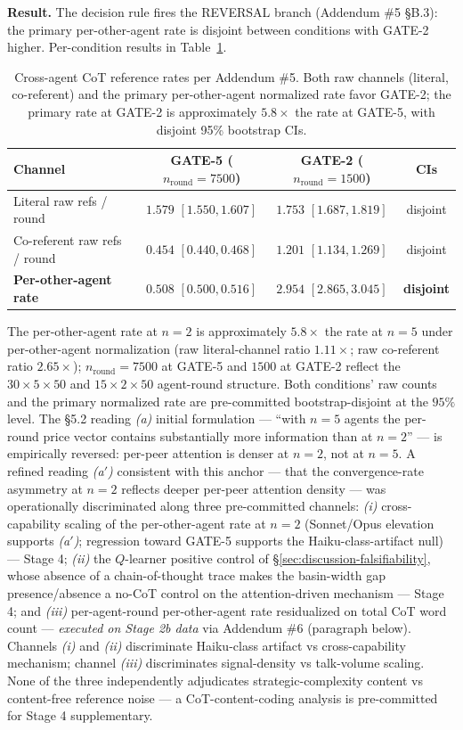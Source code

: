 \textbf{Result.} The decision rule fires the REVERSAL branch (Addendum \#5 \S B.3): the primary per-other-agent rate is disjoint between conditions with GATE-2 higher. Per-condition results in Table~\ref{tab:cot-cross-references}.

\begin{table}[h]
\centering
\caption{Cross-agent CoT reference rates per Addendum \#5. Both raw channels (literal, co-referent) and the primary per-other-agent normalized rate favor GATE-2; the primary rate at GATE-2 is approximately $5.8\times$ the rate at GATE-5, with disjoint 95\% bootstrap CIs.}
\label{tab:cot-cross-references}
\begin{tabular}{lccc}
\toprule
Channel & GATE-5 ($n_{\text{round}} = 7500$) & GATE-2 ($n_{\text{round}} = 1500$) & CIs \\
\midrule
Literal raw refs / round & $1.579$ $[1.550, 1.607]$ & $1.753$ $[1.687, 1.819]$ & disjoint \\
Co-referent raw refs / round & $0.454$ $[0.440, 0.468]$ & $1.201$ $[1.134, 1.269]$ & disjoint \\
\textbf{Per-other-agent rate} & $\mathbf{0.508}$ $\mathbf{[0.500, 0.516]}$ & $\mathbf{2.954}$ $\mathbf{[2.865, 3.045]}$ & \textbf{disjoint} \\
\bottomrule
\end{tabular}
\end{table}

The per-other-agent rate at $n = 2$ is approximately $5.8\times$ the rate at $n = 5$ under per-other-agent normalization (raw literal-channel ratio $1.11\times$; raw co-referent ratio $2.65\times$); $n_{\text{round}} = 7500$ at GATE-5 and $1500$ at GATE-2 reflect the $30 \times 5 \times 50$ and $15 \times 2 \times 50$ agent-round structure. Both conditions' raw counts and the primary normalized rate are pre-committed bootstrap-disjoint at the $95\%$ level. The §5.2 reading \emph{(a)} initial formulation --- ``with $n=5$ agents the per-round price vector contains substantially more information than at $n=2$'' --- is empirically reversed: per-peer attention is denser at $n = 2$, not at $n = 5$. A refined reading \emph{(a$'$)} consistent with this anchor --- that the convergence-rate asymmetry at $n = 2$ reflects deeper per-peer attention density --- was operationally discriminated along three pre-committed channels: \emph{(i)} cross-capability scaling of the per-other-agent rate at $n = 2$ (Sonnet/Opus elevation supports \emph{(a$'$)}; regression toward GATE-5 supports the Haiku-class-artifact null) --- Stage 4; \emph{(ii)} the $Q$-learner positive control of \S\ref{sec:discussion-falsifiability}, whose absence of a chain-of-thought trace makes the basin-width gap presence/absence a no-CoT control on the attention-driven mechanism --- Stage 4; and \emph{(iii)} per-agent-round per-other-agent rate residualized on total CoT word count --- \emph{executed on Stage 2b data} via Addendum \#6 (paragraph below). Channels \emph{(i)} and \emph{(ii)} discriminate Haiku-class artifact vs cross-capability mechanism; channel \emph{(iii)} discriminates signal-density vs talk-volume scaling. None of the three independently adjudicates strategic-complexity content vs content-free reference noise --- a CoT-content-coding analysis is pre-committed for Stage 4 supplementary.

